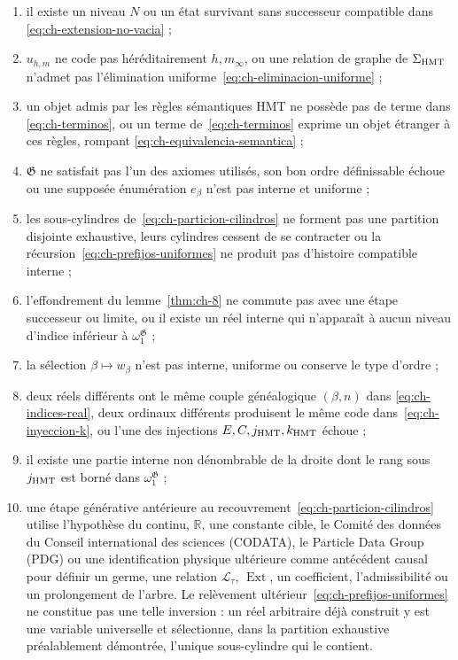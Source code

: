 \begin{enumerate}
\item il existe un niveau \(N\) ou un état survivant sans successeur compatible dans \eqref{eq:ch-extension-no-vacia} ;
\item \(u_{h,m}\) ne code pas héréditairement \(h,m_\infty\), ou une relation
de graphe de \(\Sigma_{\rm HMT}\) n’admet pas l’élimination uniforme~\eqref{eq:ch-eliminacion-uniforme} ;
\item un objet admis par les règles sémantiques HMT ne possède pas de terme dans \eqref{eq:ch-terminos}, ou un terme de~\eqref{eq:ch-terminos} exprime un objet étranger à ces règles, rompant \eqref{eq:ch-equivalencia-semantica} ;
\item \(\mathfrak G\) ne satisfait pas l’un des axiomes utilisés, son bon
ordre définissable échoue ou une supposée énumération \(e_\beta\) n’est pas interne et
uniforme ;
\item les sous-cylindres de~\eqref{eq:ch-particion-cilindros} ne forment pas une partition disjointe exhaustive, leurs cylindres cessent de se contracter ou la récursion~\eqref{eq:ch-prefijos-uniformes} ne produit pas d'histoire compatible interne ;
\item l’effondrement du lemme~\ref{thm:ch-8} ne commute pas avec une étape successeur ou limite, ou il existe
un réel interne qui n’apparaît à aucun niveau d’indice inférieur à
\(\omega_1^{\mathfrak G}\) ;
\item la sélection \(\beta\mapsto w_\beta\) n’est pas interne, uniforme ou conserve
le type d’ordre ;
\item deux réels différents ont le même couple généalogique \((\beta,n)\) dans
\eqref{eq:ch-indices-real}, deux ordinaux différents produisent le même code dans~\eqref{eq:ch-inyeccion-k}, ou
l’une des injections \(E,C,j_{\rm HMT},k_{\rm HMT}\) échoue ;
\item il existe une partie interne non dénombrable de la droite dont le rang sous \(j_{\rm HMT}\) est borné dans \(\omega_1^{\mathfrak G}\) ;
\item une étape générative antérieure au recouvrement~\eqref{eq:ch-particion-cilindros} utilise l’hypothèse du continu,
\(\mathbb R\), une constante cible, le Comité des données du Conseil
international des sciences (CODATA), le Particle Data Group (PDG) ou une identification physique
ultérieure comme antécédent causal pour définir un germe, une relation
\(\mathscr L_\tau\), \(\operatorname{Ext}\), un coefficient, l’admissibilité
ou un prolongement de l’arbre. Le relèvement
ultérieur~\eqref{eq:ch-prefijos-uniformes} ne constitue pas une telle inversion : un réel arbitraire déjà construit y est une variable
universelle et sélectionne, dans la partition exhaustive préalablement
démontrée, l’unique sous-cylindre qui le contient.
\end{enumerate}

